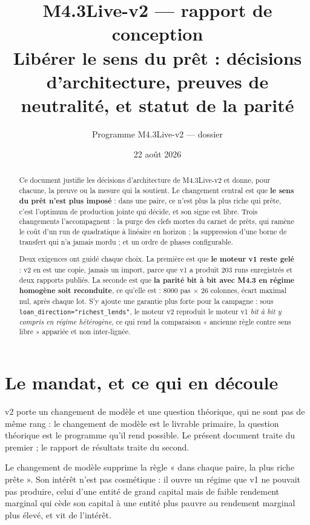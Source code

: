 \documentclass[11pt,a4paper]{article}
\title{M4.3Live-v2 --- rapport de conception\\
\large Libérer le sens du prêt : décisions d'architecture, preuves de
neutralité, et statut de la parité}
\author{Programme M4.3Live-v2 --- dossier \code{m4\_3live\_v2\_credit\_soc}}
\date{22 août 2026}
\newcommand{\code}[1]{\texttt{#1}}
\begin{document}
\maketitle

\begin{abstract}
Ce document justifie les décisions d'architecture de M4.3Live-v2 et donne, pour
chacune, la preuve ou la mesure qui la soutient. Le changement central est que
\textbf{le sens du prêt n'est plus imposé} : dans une paire, ce n'est plus la
plus riche qui prête, c'est l'optimum de production jointe qui décide, et son
signe est libre. Trois changements l'accompagnent : la purge des clefs mortes du
carnet de prêts, qui ramène le coût d'un run de quadratique à linéaire en
horizon ; la suppression d'une borne de transfert qui n'a jamais mordu ; et un
ordre de phases configurable.

Deux exigences ont guidé chaque choix. La première est que \textbf{le moteur v1
reste gelé} : v2 en est une copie, jamais un import, parce que v1 a produit 203
runs enregistrés et deux rapports publiés. La seconde est que \textbf{la parité
bit à bit avec M4.3 en régime homogène soit reconduite}, ce qu'elle est :
8000 pas $\times$ 26 colonnes, écart maximal nul, après chaque lot.
S'y ajoute une garantie plus forte pour la campagne : sous
\code{loan\_direction="richest\_lends"}, le moteur v2 reproduit le moteur v1
\emph{bit à bit y compris en régime hétérogène}, ce qui rend la comparaison
« ancienne règle contre sens libre » appariée et non inter-lignée.
\end{abstract}

\tableofcontents



\section{Le mandat, et ce qui en découle}

v2 porte un changement de modèle et une question théorique, qui ne sont pas de
même rang : le changement de modèle est le livrable primaire, la question
théorique est le programme qu'il rend possible. Le présent document traite du
premier ; le rapport de résultats traite du second.

Le changement de modèle supprime la règle « dans chaque paire, la plus riche
prête ». Son intérêt n'est pas cosmétique : il ouvre un régime que v1 ne pouvait
pas produire, celui d'une entité de grand capital mais de faible rendement
marginal qui cède son capital à une entité plus pauvre au rendement marginal
plus élevé, et vit de l'intérêt.
\end{document}
